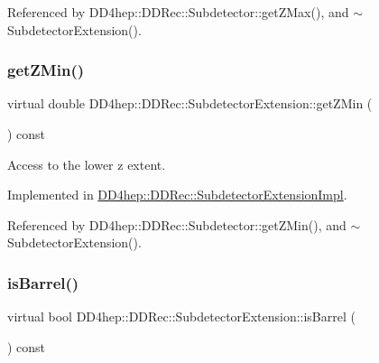 Referenced by D\+D4hep\+::\+D\+D\+Rec\+::\+Subdetector\+::get\+Z\+Max(), and $\sim$\+Subdetector\+Extension().

\hypertarget{class_d_d4hep_1_1_d_d_rec_1_1_subdetector_extension_a5229b92c90c65a76156b5ea082aa0301}{}\label{class_d_d4hep_1_1_d_d_rec_1_1_subdetector_extension_a5229b92c90c65a76156b5ea082aa0301} 
\subsubsection{\texorpdfstring{get\+Z\+Min()}{getZMin()}}
{\footnotesize\ttfamily virtual double D\+D4hep\+::\+D\+D\+Rec\+::\+Subdetector\+Extension\+::get\+Z\+Min (\begin{DoxyParamCaption}{ }\end{DoxyParamCaption}) const\hspace{0.3cm}{\ttfamily [pure virtual]}}



Access to the lower z extent. 



Implemented in \hyperlink{class_d_d4hep_1_1_d_d_rec_1_1_subdetector_extension_impl_a49a166b8f3d0ae8f96f5440d792b9dff}{D\+D4hep\+::\+D\+D\+Rec\+::\+Subdetector\+Extension\+Impl}.



Referenced by D\+D4hep\+::\+D\+D\+Rec\+::\+Subdetector\+::get\+Z\+Min(), and $\sim$\+Subdetector\+Extension().

\hypertarget{class_d_d4hep_1_1_d_d_rec_1_1_subdetector_extension_a12be99462aa14feba6df7eed02468994}{}\label{class_d_d4hep_1_1_d_d_rec_1_1_subdetector_extension_a12be99462aa14feba6df7eed02468994} 
\subsubsection{\texorpdfstring{is\+Barrel()}{isBarrel()}}
{\footnotesize\ttfamily virtual bool D\+D4hep\+::\+D\+D\+Rec\+::\+Subdetector\+Extension\+::is\+Barrel (\begin{DoxyParamCaption}{ }\end{DoxyParamCaption}) const\hspace{0.3cm}{\ttfamily [pure virtual]}}



